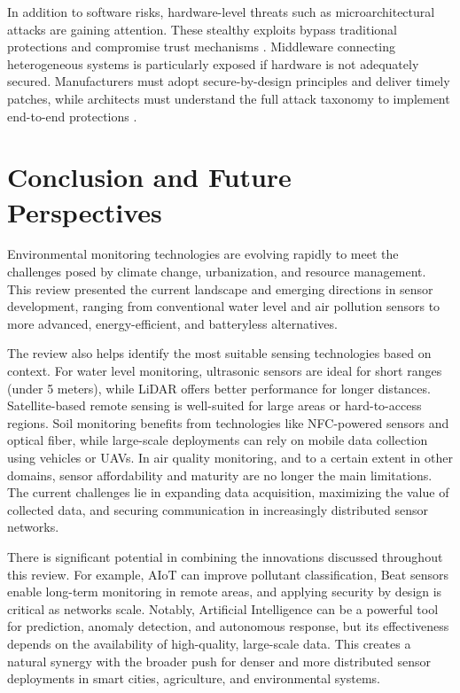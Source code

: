 \documentclass[conference]{IEEEtran}
\begin{document}
In addition to software risks, hardware-level threats such as microarchitectural attacks are gaining attention. These stealthy exploits bypass traditional protections and compromise trust mechanisms \cite{fournaris_2017_exploiting}. Middleware connecting heterogeneous systems is particularly exposed if hardware is not adequately secured. Manufacturers must adopt secure-by-design principles and deliver timely patches, while architects must understand the full attack taxonomy to implement end-to-end protections \cite{fournaris_2017_exploiting, pimentel_2017_exploring}.

\section{Conclusion and Future Perspectives} \label{cap:conclusion}

Environmental monitoring technologies are evolving rapidly to meet the challenges posed by climate change, urbanization, and resource management. This review presented the current landscape and emerging directions in sensor development, ranging from conventional water level and air pollution sensors to more advanced, energy-efficient, and batteryless alternatives.

The review also helps identify the most suitable sensing technologies based on context. For water level monitoring, ultrasonic sensors are ideal for short ranges (under 5 meters), while LiDAR offers better performance for longer distances. Satellite-based remote sensing is well-suited for large areas or hard-to-access regions. Soil monitoring benefits from technologies like NFC-powered sensors and optical fiber, while large-scale deployments can rely on mobile data collection using vehicles or UAVs. In air quality monitoring, and to a certain extent in other domains, sensor affordability and maturity are no longer the main limitations. The current challenges lie in expanding data acquisition, maximizing the value of collected data, and securing communication in increasingly distributed sensor networks.

There is significant potential in combining the innovations discussed throughout this review. For example, AIoT can improve pollutant classification, Beat sensors enable long-term monitoring in remote areas, and applying security by design is critical as networks scale. Notably, Artificial Intelligence can be a powerful tool for prediction, anomaly detection, and autonomous response, but its effectiveness depends on the availability of high-quality, large-scale data. This creates a natural synergy with the broader push for denser and more distributed sensor deployments in smart cities, agriculture, and environmental systems.
\end{document}
